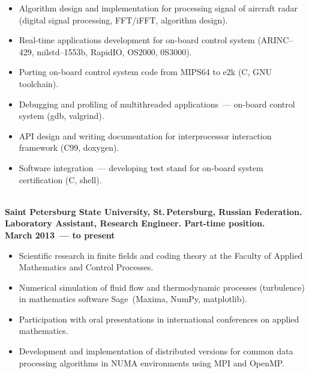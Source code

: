 \documentclass[a4paper,oneside,12pt]{article}
\begin{document}
\begin{itemize}
\item Algorithm design and implementation for processing signal of aircraft radar (digital signal processing, FFT/iFFT, algorithm design).
\item Real-time applications development for on-board control system (ARINC--429, milstd--1553b, RapidIO, OS2000, 0S3000).
\item Porting on-board control system code from MIPS64 to e2k (C, GNU toolchain).
\item Debugging and profiling of multithreaded applications~--- on-board control system (gdb, valgrind).
\item API design and writing documentation for interprocessor interaction framework (C99, doxygen).
\item Software integration~--- developing test stand for on-board system certification (C, shell).
\end{itemize}

~\\[-1em]

{\bf
Saint Petersburg State University, St.\,Petersburg, Russian Federation. Laboratory Assistant, Research Engineer. Part-time position.\\
March 2013~--- to present
}

\begin{itemize}
\item Scientific research in finite fields and coding theory at the Faculty of Applied Mathematics and Control Processes.
\item Numerical simulation of fluid flow and thermodynamic processes (turbulence) in mathematics software Sage~(Maxima, NumPy, matplotlib).
\item Participation with oral presentations in international conferences on applied mathematics.
\item Development and implementation of distributed versions for common data processing algorithms in NUMA environments using MPI and OpenMP.
\end{itemize}
\end{document}
